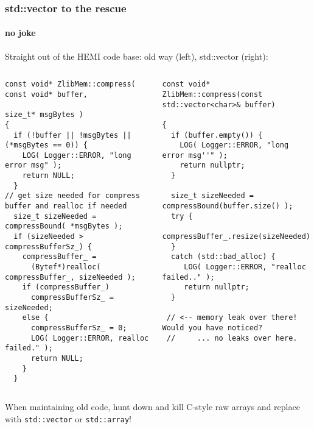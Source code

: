 \begin{frame}[fragile]
\frametitle{std::vector to the rescue}
\framesubtitle{no joke}
Straight out of the HEMI code base: old way (left), std::vector (right):
\begin{columns}[t]
{\tiny\begin{verbatim}
const void* ZlibMem::compress( const void* buffer,
                               size_t* msgBytes )
{
  if (!buffer || !msgBytes || (*msgBytes == 0)) {
    LOG( Logger::ERROR, "long error msg" );
    return NULL;
  }
// get size needed for compress buffer and realloc if needed
  size_t sizeNeeded = compressBound( *msgBytes );
  if (sizeNeeded > compressBufferSz_) {
    compressBuffer_ = 
      (Bytef*)realloc( compressBuffer_, sizeNeeded );
    if (compressBuffer_)
      compressBufferSz_ = sizeNeeded;
    else {
      compressBufferSz_ = 0;
      LOG( Logger::ERROR, realloc failed." );
      return NULL;
    }
  }

\end{verbatim}}
\pause{}
{\tiny\begin{verbatim}
const void* ZlibMem::compress(const std::vector<char>& buffer)

{
  if (buffer.empty()) {
    LOG( Logger::ERROR, "long error msg''" );
    return nullptr;
  }

  size_t sizeNeeded = compressBound(buffer.size() );
  try {
    compressBuffer_.resize(sizeNeeded);
  }
  catch (std::bad_alloc) {
     LOG( Logger::ERROR, "realloc failed.." );
     return nullptr;
  }

 // <-- memory leak over there!  Would you have noticed?
 //     ... no leaks over here.

\end{verbatim}}
\end{columns}
\pause{}

When maintaining old code, hunt down and kill C-style raw arrays
 and replace with \texttt{std::vector} or
\texttt{std::array}!

\end{frame}





